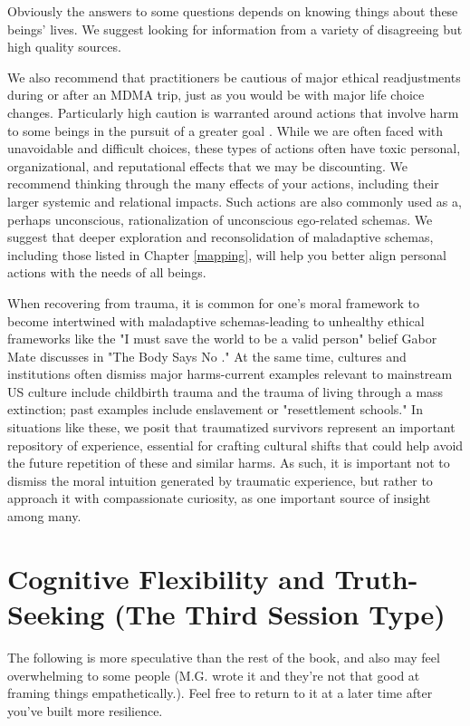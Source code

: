 \documentclass[12pt,letterpaper]{book}
\begin{document}
Obviously the answers to some questions depends on knowing things about these beings' lives. We suggest looking for information from a variety of disagreeing but high quality sources.

We also recommend that practitioners be cautious of major ethical readjustments during or after an MDMA trip, just as you would be with major life choice changes. Particularly high caution is warranted around actions that involve harm to some beings in the pursuit of a greater goal \cite{askellSelfServing}. While we are often faced with unavoidable and difficult choices, these types of actions often have toxic personal, organizational, and reputational effects that we may be discounting. We recommend thinking through the many effects of your actions, including their larger systemic and relational impacts. Such actions are also commonly used as a, perhaps unconscious, rationalization of unconscious ego-related schemas. We suggest that deeper exploration and reconsolidation of maladaptive schemas, including those listed in Chapter \ref{mapping}, will help you better align personal actions with the needs of all beings.

When recovering from trauma, it is common for one's moral framework to become intertwined with maladaptive schemas-leading to unhealthy ethical frameworks like the "I must save the world to be a valid person" belief Gabor Mate discusses in "The Body Says No \cite{mate2011body}." At the same time, cultures and institutions often dismiss major harms-current examples relevant to mainstream US culture include childbirth trauma and the trauma of living through a mass extinction; past examples include enslavement or "resettlement schools." In situations like these, we posit that traumatized survivors represent an important repository of experience, essential for crafting cultural shifts that could help avoid the future repetition of these and similar harms. As such, it is important not to dismiss the moral intuition generated by traumatic experience, but rather to approach it with compassionate curiosity, as one important source of insight among many.
\section{Cognitive Flexibility and Truth-Seeking (The Third Session Type)}
\label{cognitiveflexibility}
The following is more speculative than the rest of the book, and also may feel overwhelming to some people (M.G. wrote it and they're not that good at framing things empathetically.). Feel free to return to it at a later time after you’ve built more resilience.
\end{document}

